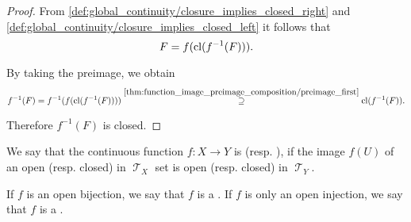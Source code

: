 \begin{proof}
  From \eqref{def:global_continuity/closure_implies_closed_right} and \eqref{def:global_continuity/closure_implies_closed_left} it follows that
  \begin{equation*}
    F = f(\operatorname{cl}(f^{-1}(F))).
  \end{equation*}

  By taking the preimage, we obtain
  \begin{equation*}
    f^{-1}(F)
    =
    f^{-1}(f(\operatorname{cl}(f^{-1}(F))))
    \overset {\ref{thm:function_image_preimage_composition/preimage_first}} \supseteq
    \operatorname{cl}(f^{-1}(F)).
  \end{equation*}

  Therefore \( f^{-1}(F) \) is closed.
\end{proof}

\begin{definition}\label{def:homeomorphism}
  We say that the continuous function \( f: X \to Y \) is  (resp. ), if the image \( f(U) \) of an open (resp. closed) in \( \mscrT_X \) set is open (resp. closed) in \( \mscrT_Y \).

  If \( f \) is an open bijection, we say that \( f \) is a . If \( f \) is only an open injection, we say that \( f \) is a .
\end{definition}

